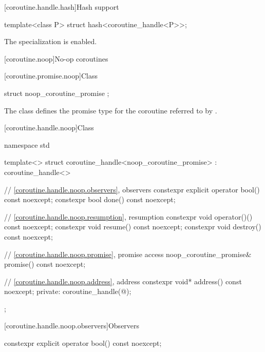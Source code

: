 [coroutine.handle.hash]{Hash support}

%
\begin{itemdecl}
template<class P> struct hash<coroutine_handle<P>>;
\end{itemdecl}

\begin{itemdescr}
\pnum
The specialization is enabled.
\end{itemdescr}

[coroutine.noop]{No-op coroutines}

[coroutine.promise.noop]{Class }

%
\begin{itemdecl}
struct noop_coroutine_promise {};
\end{itemdecl}

\begin{itemdescr}
\pnum
The class  defines the promise type for
the coroutine referred to
by .
\end{itemdescr}

[coroutine.handle.noop]{Class }

%
\begin{codeblock}
namespace std {
  template<>
  struct coroutine_handle<noop_coroutine_promise> : coroutine_handle<>
  {
    // \ref{coroutine.handle.noop.observers}, observers
    constexpr explicit operator bool() const noexcept;
    constexpr bool done() const noexcept;

    // \ref{coroutine.handle.noop.resumption}, resumption
    constexpr void operator()() const noexcept;
    constexpr void resume() const noexcept;
    constexpr void destroy() const noexcept;

    // \ref{coroutine.handle.noop.promise}, promise access
    noop_coroutine_promise& promise() const noexcept;

    // \ref{coroutine.handle.noop.address}, address
    constexpr void* address() const noexcept;
  private:
    coroutine_handle(@\unspec@);
  };
}
\end{codeblock}

[coroutine.handle.noop.observers]{Observers}

%
\begin{itemdecl}
constexpr explicit operator bool() const noexcept;
\end{itemdecl}


